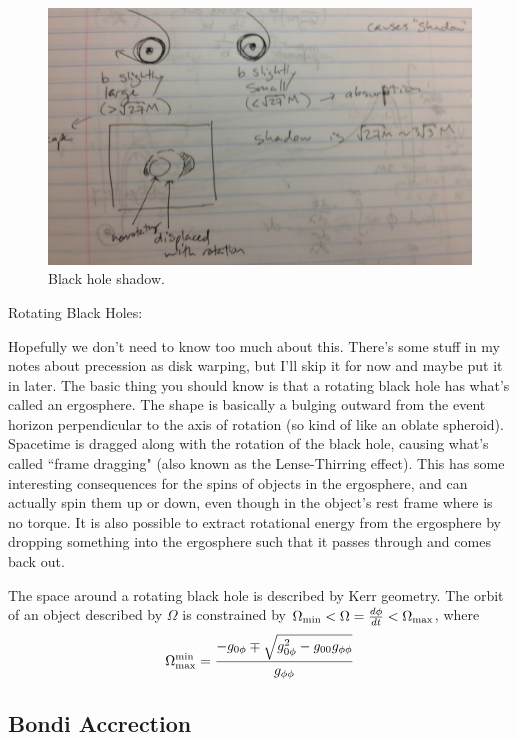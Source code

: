 \begin{figure}[!h]
\begin{center}
\includegraphics[width=\textwidth]{bh_shadow.jpg}
\caption{Black hole shadow. \label{f:bh_shadow}}
\end{center}
\end{figure}

Rotating Black Holes:

Hopefully we don't need to know too much about this. There's some stuff in my notes about precession as disk warping, but I'll skip it for now and maybe put it in later. The basic thing you should know is that a rotating black hole has what's called an ergosphere. The shape is basically a bulging outward from the event horizon perpendicular to the axis of rotation (so kind of like an oblate spheroid). Spacetime is dragged along with the rotation of the black hole, causing what's called ``frame dragging" (also known as the Lense-Thirring effect). This has some interesting consequences for the spins of objects in the ergosphere, and can actually spin them up or down, even though in the object's rest frame where is no torque. It is also possible to extract rotational energy from the ergosphere by dropping something into the ergosphere such that it passes through and comes back out.

The space around a rotating black hole is described by Kerr geometry. The orbit of an object described by $\Omega$ is constrained by $\Omega_{\rm min} < \Omega = \frac{d\phi}{dt} < \Omega_{\rm max}$, where
\begin{equation}
\Omega^{\rm min}_{\rm max} = \frac{ - g_{0\phi} \mp \sqrt{g_{0\phi}^2 - g_{00}g_{\phi\phi}}}{g_{\phi\phi}}
\end{equation}

\subsection{Bondi Accrection}

